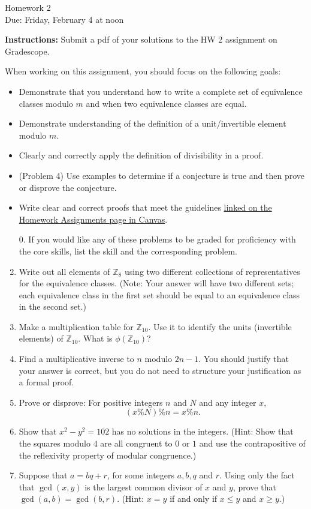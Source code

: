 \documentclass[12pt]{article}
\newcommand{\Z}{\mathbb{Z}}
\begin{document}
\begin{center}
{\Large Homework 2}\\
Due: Friday,  February 4 at noon\\


\end{center}
{\bf Instructions:} Submit a pdf of your solutions to the HW 2 assignment on Gradescope. 

When working on this assignment, you should focus on the following goals:
\begin{itemize}
\item Demonstrate that you understand how to write a complete set of equivalence classes modulo $m$ and when two equivalence classes are equal. 
\item Demonstrate understanding of the definition of a unit/invertible element modulo $m$.  
\item Clearly and correctly apply the definition of divisibility in a proof. 
\item (Problem 4) Use examples to determine if a conjecture is true and then prove or disprove the conjecture. 
\item Write clear and correct proofs that meet the guidelines \href{https://canvas.umn.edu/courses/292043/pages/writing-guidelines}{linked on the Homework Assignments page in Canvas}.
\end{itemize}

\begin{enumerate}
\item[0.] If you would like any of these problems to be graded for proficiency with the core skills, list the skill and the corresponding problem. 
\item Write out all elements of $\Z_{8}$ using two different collections of representatives for the equivalence classes.  (Note: Your answer will have two different sets; each equivalence class in the first set should be equal to an equivalence class in the second set.)
\item Make a multiplication table for $\Z_{10}$. Use it to identify the units (invertible elements) of $\Z_{10}$.  What is $\phi(\Z_{10})$?
\item Find a multiplicative inverse to $n$ modulo $2n-1$. You should justify that your answer is correct, but you do not need to structure your justification as a formal proof. 

\item Prove or disprove: For positive integers $n$ and $N$ and any integer $x$, $$(x\% N)\% n= x\% n.$$
\item Show that $x^2-y^2=102$ has no solutions in the integers. (Hint: Show that the squares modulo $4$ are all congruent to $0$ or $1$ and use the contrapositive of the reflexivity property of modular congruence.)

\item Suppose that $a=bq+r$, for some integers $a,b, q$ and $r$. Using only the fact that $\gcd(x,y)$ is the largest common divisor of $x$ and $y$, prove that $\gcd(a,b)=\gcd(b,r)$.  (Hint: $x=y$ if and only if $x\le y$ and $x\ge y$.)

\end{enumerate}
\end{document}
